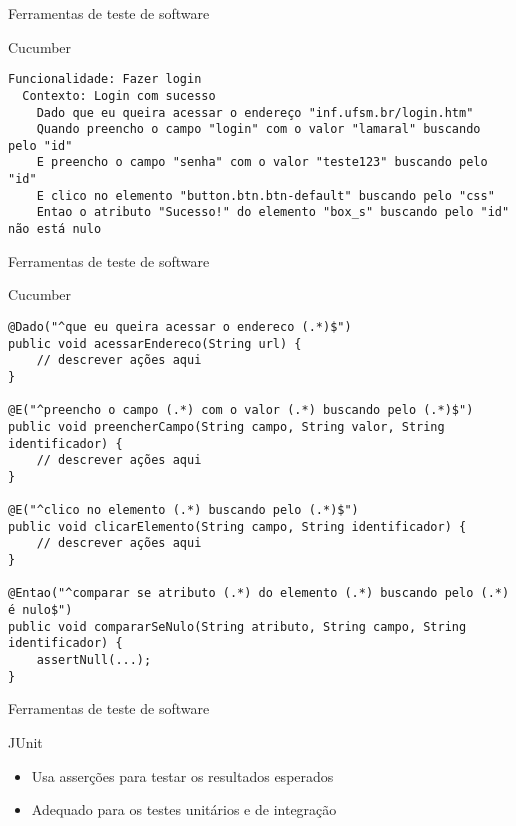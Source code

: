 \documentclass{beamer}
\begin{document}
\begin{frame}[fragile]{Ferramentas de teste de software}
    \item Cucumber
    \begin{lstlisting}
Funcionalidade: Fazer login
  Contexto: Login com sucesso
    Dado que eu queira acessar o endereço "inf.ufsm.br/login.htm"
    Quando preencho o campo "login" com o valor "lamaral" buscando pelo "id"
    E preencho o campo "senha" com o valor "teste123" buscando pelo "id"
    E clico no elemento "button.btn.btn-default" buscando pelo "css"
    Entao o atributo "Sucesso!" do elemento "box_s" buscando pelo "id" não está nulo
	\end{lstlisting}
\end{frame}
\begin{frame}[fragile]{Ferramentas de teste de software}
    \item Cucumber
    \begin{lstlisting}
@Dado("^que eu queira acessar o endereco (.*)$")
public void acessarEndereco(String url) {
    // descrever ações aqui
}

@E("^preencho o campo (.*) com o valor (.*) buscando pelo (.*)$")
public void preencherCampo(String campo, String valor, String identificador) {
    // descrever ações aqui
}

@E("^clico no elemento (.*) buscando pelo (.*)$")
public void clicarElemento(String campo, String identificador) {
    // descrever ações aqui
}

@Entao("^comparar se atributo (.*) do elemento (.*) buscando pelo (.*) é nulo$")
public void compararSeNulo(String atributo, String campo, String identificador) {
    assertNull(...);
}

	\end{lstlisting}
\end{frame}
\begin{frame}[fragile]{Ferramentas de teste de software}
    \item JUnit
	\begin{itemize}
		\item Usa asserções para testar os resultados esperados
        \item Adequado para os testes unitários e de integração
	\end{itemize}
\end{frame}
\end{document}
